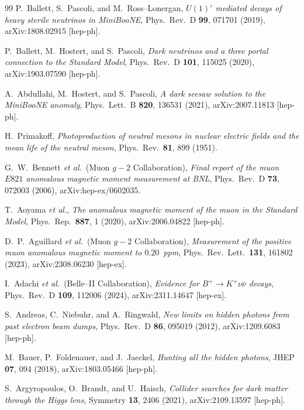 \begin{thebibliography}{99}
P.~Ballett, S.~Pascoli, and M.~Ross--Lonergan,
\emph{$U(1)'$ mediated decays of heavy sterile neutrinos in
MiniBooNE},
Phys.\ Rev.\ D \textbf{99}, 071701 (2019),
arXiv:1808.02915 [hep-ph].

P.~Ballett, M.~Hostert, and S.~Pascoli,
\emph{Dark neutrinos and a three portal connection to the Standard
Model},
Phys.\ Rev.\ D \textbf{101}, 115025 (2020),
arXiv:1903.07590 [hep-ph].

A.~Abdullahi, M.~Hostert, and S.~Pascoli,
\emph{A dark seesaw solution to the MiniBooNE anomaly},
Phys.\ Lett.\ B \textbf{820}, 136531 (2021),
arXiv:2007.11813 [hep-ph].

H.~Primakoff,
\emph{Photoproduction of neutral mesons in nuclear electric fields
and the mean life of the neutral meson},
Phys.\ Rev.\ \textbf{81}, 899 (1951).

G.~W.~Bennett \emph{et al.}\ (Muon $g\!-\!2$ Collaboration),
\emph{Final report of the muon $E821$ anomalous magnetic moment
measurement at BNL},
Phys.\ Rev.\ D \textbf{73}, 072003 (2006),
arXiv:hep-ex/0602035.

T.~Aoyama \emph{et al.},
\emph{The anomalous magnetic moment of the muon in the Standard
Model},
Phys.\ Rep.\ \textbf{887}, 1 (2020),
arXiv:2006.04822 [hep-ph].

D.~P.~Aguillard \emph{et al.}\ (Muon $g\!-\!2$ Collaboration),
\emph{Measurement of the positive muon anomalous magnetic moment to
$0.20$~ppm},
Phys.\ Rev.\ Lett.\ \textbf{131}, 161802 (2023),
arXiv:2308.06230 [hep-ex].

I.~Adachi \emph{et al.}\ (Belle--II Collaboration),
\emph{Evidence for $B^+\!\to K^+\nu\bar\nu$ decays},
Phys.\ Rev.\ D \textbf{109}, 112006 (2024),
arXiv:2311.14647 [hep-ex].

S.~Andreas, C.~Niebuhr, and A.~Ringwald,
\emph{New limits on hidden photons from past electron beam dumps},
Phys.\ Rev.\ D \textbf{86}, 095019 (2012),
arXiv:1209.6083 [hep-ph].

M.~Bauer, P.~Foldenauer, and J.~Jaeckel,
\emph{Hunting all the hidden photons},
JHEP \textbf{07}, 094 (2018),
arXiv:1803.05466 [hep-ph].

S.~Argyropoulos, O.~Brandt, and U.~Haisch,
\emph{Collider searches for dark matter through the Higgs lens},
Symmetry \textbf{13}, 2406 (2021),
arXiv:2109.13597 [hep-ph].


\end{thebibliography}
